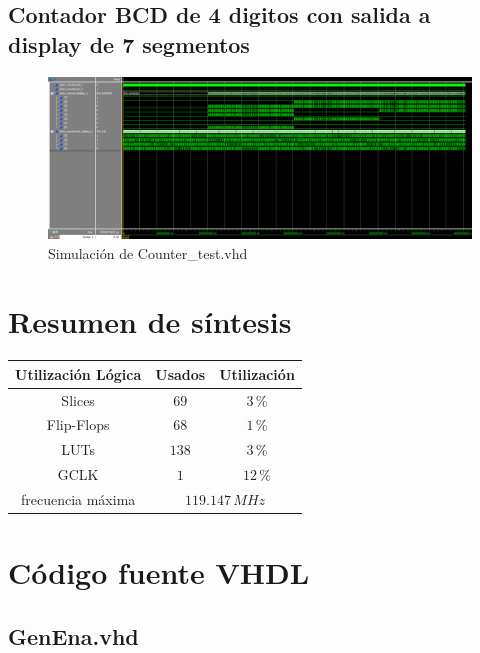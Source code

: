 \documentclass[10pt,spanish,a4paper,openany,notitlepage]{article}
\begin{document}
\subsection{Contador BCD de 4 digitos con salida a display de 7 segmentos}

\begin{figure}[H] %
\begin{center}
\includegraphics[scale=0.4]{./imagenes/Counter.png}
\caption{Simulación de Counter\_test.vhd}
 \label{fig:sim_Counter}
\end{center}
\end{figure}


\section{Resumen de síntesis}

\begin{center}
\begin{tabular}{|c|c|c|}\hline
Utilización Lógica & Usados & Utilización \\\hline
Slices & $69$ & $3\, \unit{\%}$ \\\hline
Flip-Flops & $68$ & $1\, \unit{\%}$ \\\hline
LUTs & $138$ & $3\, \unit{\%}$ \\\hline
GCLK  & $1$ & $12\, \unit{\%}$ \\\hline\hline
frecuencia máxima &  \multicolumn{2}{c|}{$119.147\, \unit{MHz}$} \\\hline
\end{tabular}
\end{center}

\newpage
\section{Código fuente VHDL}

\subsection{GenEna.vhd}

\newpage
\end{document}
